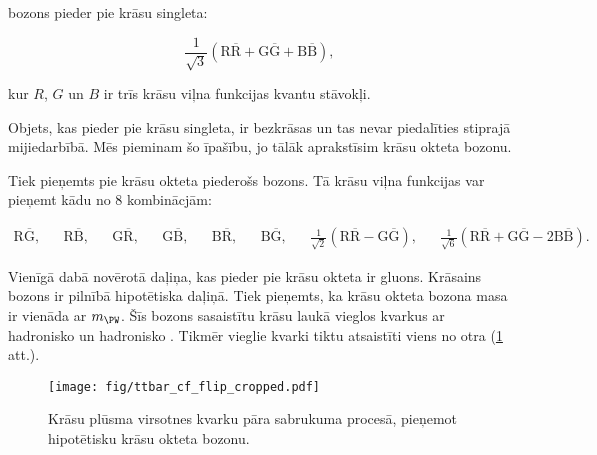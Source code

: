 \PW bozons pieder pie krāsu singleta:

\begin{equation}
\frac{1}{\sqrt{3}}\left(\text{R}\overline{\text{R}}+\text{G}\overline{\text{G}}+\text{B}\overline{\text{B}}\right),
\end{equation}

kur $R$, $G$ un $B$ ir trīs krāsu viļna funkcijas kvantu stāvokļi.

Objets, kas pieder pie krāsu singleta, ir bezkrāsas un tas nevar piedalīties stiprajā mijiedarbībā. Mēs pieminam šo īpašību, jo tālāk aprakstīsim krāsu okteta \PW bozonu.

Tiek pieņemts pie krāsu okteta piederošs \PW bozons. Tā krāsu viļna funkcijas var pieņemt kādu no 8 kombinācjām:

\begin{align}
\text{R}\overline{\text{G}}, &&
\text{R}\overline{\text{B}}, &&
\text{G}\overline{\text{R}}, &&
\text{G}\overline{\text{B}}, &&
\text{B}\overline{\text{R}}, &&
\text{B}\overline{\text{G}}, &&
\frac{1}{\sqrt{2}}\left(\text{R}\overline{\text{R}}-\text{G}\overline{\text{G}}\right), &&
\frac{1}{\sqrt{6}}\left(\text{R}\overline{\text{R}}+\text{G}\overline{\text{G}}-2\text{B}\overline{\text{B}}\right).
\end{align}

Vienīgā dabā novērotā daļiņa, kas pieder pie krāsu okteta ir gluons. Krāsains \PW bozons ir pilnībā hipotētiska daļiņā. Tiek pieņemts, ka krāsu okteta \PW bozona masa ir vienāda ar $m_{\PW}$. Šīs bozons sasaistītu krāsu laukā vieglos kvarkus ar hadronisko \cPqb un hadronisko \cPqt. Tikmēr vieglie kvarki tiktu atsaistīti viens no otra (\ref{fig:ttbar_cf_octet} att.).
  
  \begin{figure}[h!]
  \centering
  \texttt{[image: fig/ttbar\_cf\_flip\_cropped.pdf]}
  \caption{Krāsu plūsma virsotnes kvarku pāra sabrukuma procesā, pieņemot hipotētisku krāsu okteta \PW bozonu.}
  \label{fig:ttbar_cf_octet}
\end{figure}

